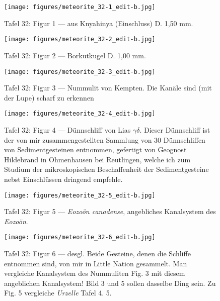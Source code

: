 \documentclass[a4paper, 12pt, oneside]{article}
\begin{document}
\clearpage
{}
\begin{figure}[t]
\texttt{[image: figures/meteorite\_32-1\_edit-b.jpg]}
\caption{Tafel 32: Figur 1 --- aus Knyahinya (Einschluss) D. 1,50 mm.}
\centering
\end{figure}
\clearpage
\begin{figure}[t]
\texttt{[image: figures/meteorite\_32-2\_edit-b.jpg]}
\caption{Tafel 32: Figur 2 --- Borkutkugel D. 1,00 mm.}
\centering
\end{figure}
\clearpage
\begin{figure}[t]
\texttt{[image: figures/meteorite\_32-3\_edit-b.jpg]}
\caption{Tafel 32: Figur 3 --- Nummulit von Kempten. Die Kanäle sind (mit der Lupe) scharf zu erkennen}
\centering
\end{figure}
\clearpage
\begin{figure}[t]
\texttt{[image: figures/meteorite\_32-4\_edit-b.jpg]}
\caption{Tafel 32: Figur 4 --- Dünnschliff von Lias $\gamma\delta$. Dieser Dünnschliff ist der von mir zusammengestellten Sammlung von 30 Dünnschliffen von Sedimentgesteinen entnommen, gefertigt von Geognost Hildebrand in Ohmenhausen bei Reutlingen, welche ich zum Studium der mikroskopischen Beschaffenheit der Sedimentgesteine nebst Einschlüssen dringend empfehle.}
\centering
\end{figure}
\clearpage
\begin{figure}[t]
\texttt{[image: figures/meteorite\_32-5\_edit-b.jpg]}
\caption{Tafel 32: Figur 5 --- \emph{Eozoön canadense}, angebliches Kanalsystem des \emph{Eozoön}.}
\centering
\end{figure}
\clearpage
\begin{figure}[t]
\texttt{[image: figures/meteorite\_32-6\_edit-b.jpg]}
\caption{Tafel 32: Figur 6 --- desgl. Beide Gesteine, denen die Schliffe entnommen sind, von mir in Little Nation gesammelt. Man vergleiche Kanalsystem des Nummuliten Fig. 3 mit diesem angeblichen Kanalsystem! Bild 3 und 5 sollen dasselbe Ding sein. Zu Fig. 5 vergleiche \emph{Urzelle} Tafel 4. 5.}
\centering
\end{figure}
\clearpage
\pagestyle{plain}
\printindex
\clearpage
\end{document}
